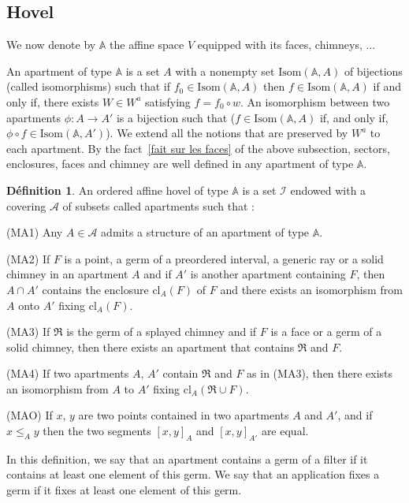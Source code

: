 \documentclass[12pt]{article}
\theoremstyle{plain}
\theoremstyle{definition}
\newtheorem{defn}[thm]{Définition}
\newcommand{\A}{\mathbb{A}}
\begin{document}
\subsection{Hovel}
We now denote by $\A$ the affine space $V$ equipped with its faces, chimneys, ...


An apartment of type $\A$ is a set $A$ with a nonempty set $\mathrm{Isom}(\A,A)$ of bijections (called isomorphisms) such that if $f_0\in \mathrm{Isom}(\A,A)$ then $f\in \mathrm{Isom}(\A,A)$ if and only if, there exists $W\in W^a$ satisfying $f=f_0\circ w$. An isomorphism between two apartments $\phi:A\rightarrow A'$ is a bijection such that ($f\in \mathrm{Isom}(\mathbb{A},A)$ if, and only if, $\phi \circ f\in \mathrm{Isom}(\A,A')$). We extend all the notions that are preserved by $W^a$ to each apartment. By the fact~\ref{fait sur les faces} of the above subsection, sectors, enclosures, faces and chimney are well defined in any apartment of type $\A$.

\begin{defn}
An ordered affine hovel of type $\A$ is a set $\mathcal{I}$ endowed with a covering $\mathcal{A}$ of subsets called apartments such that : 

(MA1) Any $A\in \mathcal{A}$ admits a structure of an apartment of type $\A$.

(MA2) If $F$ is a point, a germ of a preordered interval, a generic ray or a solid chimney in an apartment $A$ and if $A'$ is another apartment containing $F$, then $A\cap A'$ contains the enclosure $\mathrm{cl}_A(F)$ of $F$ and there exists an isomorphism from $A$ onto $A'$ fixing $\mathrm{cl}_A(F)$.

(MA3) If $\mathfrak{R}$ is the germ of a splayed chimney and if $F$ is a face or a germ of a solid chimney, then there exists an apartment that contains $\mathfrak{R}$ and $F$.

(MA4) If two apartments $A$, $A'$ contain $\mathfrak{R}$ and $F$ as in (MA3), then there exists an isomorphism from $A$ to $A'$ fixing $\mathrm{cl}_A(\mathfrak{R}\cup F)$.

(MAO) If $x$, $y$ are two points contained in two apartments $A$ and $A'$, and if $x\leq_{A} y$ then the two segments $[x,y]_A$ and $[x,y]_{A'}$ are equal.
\end{defn}


In this definition, we say that an apartment contains a germ of a filter if it contains at least one element of this germ. We say that an application fixes a germ if it fixes at least one element of this germ.
\end{document}
